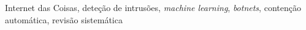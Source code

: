 \documentclass[conference,a4paper]{IEEEtran}
\begin{document}
\begin{IEEEkeywords}
Internet das Coisas, deteção de intrusões, \textit{machine learning}, \textit{botnets}, contenção automática, revisão sistemática
\end{IEEEkeywords}

\renewcommand{\contentsname}{Índice}
\setcounter{tocdepth}{1}
\noindent\begin{minipage}{\columnwidth}\footnotesize
\makeatletter\renewcommand{\l@section}[2]{\@dottedtocline{1}{0pt}{2.2em}{#1}{#2}}\makeatother
\tableofcontents
\end{minipage}

\newpage
\end{document}
